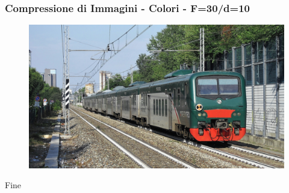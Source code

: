 \documentclass{beamer}
\begin{document}
\begin{frame}
\frametitle{Compressione di Immagini - Colori - F=30/d=10}
\begin{figure}
  \centering
  \includegraphics[width=\linewidth]{images/compression-cl-F30-d10.png}
\end{figure}
\end{frame}

\begin{frame}
\centering
\Huge
Fine
\end{frame}
\end{document}
